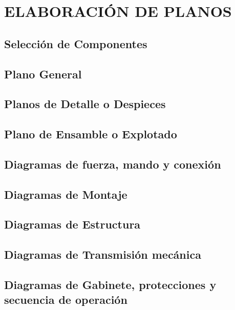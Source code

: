 \section{ELABORACIÓN DE PLANOS}

\subsection{Selección de Componentes}

\subsection{Plano General}

\subsection{Planos de Detalle o Despieces}

\subsection{Plano de Ensamble o Explotado}

\subsection{Diagramas de fuerza, mando y conexión}

\subsection{Diagramas de Montaje}

\subsection{Diagramas de Estructura}

\subsection{Diagramas de Transmisión mecánica}

\subsection{Diagramas de Gabinete, protecciones y secuencia de operación}
